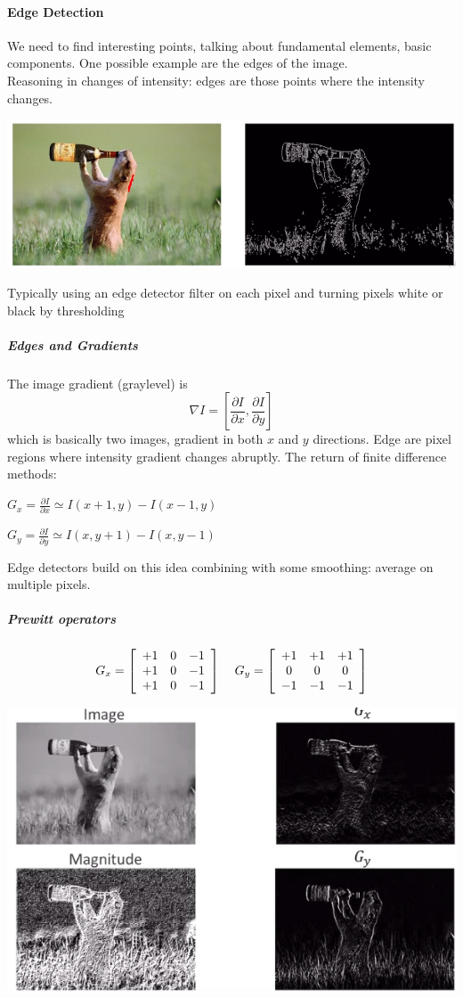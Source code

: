 \documentclass[10pt]{report}
\begin{document}
\paragraph{Edge Detection} We need to find interesting points, talking about fundamental elements, basic components. One possible example are the edges of the image.\\
Reasoning in changes of intensity: edges are those points where the intensity changes.\begin{center}
	\includegraphics[scale=0.5]{4.png}
\end{center}
Typically using an edge detector filter on each pixel and turning pixels white or black by thresholding
\subparagraph{Edges and Gradients} The image gradient (graylevel) is $$\nabla I = \left[\frac{\partial I}{\partial x},\frac{\partial I}{\partial y}\right]$$ which is basically two images, gradient in both $x$ and $y$ directions. Edge are pixel regions where intensity gradient changes abruptly. The return of finite difference methods:
\begin{list}{}{}
	\item $G_x = \frac{\partial I}{\partial x} \simeq I(x+1,y)-I(x-1,y)$
	\item $G_y = \frac{\partial I}{\partial y} \simeq I(x,y+1)-I(x,y-1)$
\end{list}
Edge detectors build on this idea combining with some smoothing: average on multiple pixels.
\subparagraph{Prewitt operators}
$$G_x = \left[\begin{array}{c c c }
+1&0&-1\\
+1&0&-1\\
+1&0&-1
\end{array}\right]\:\:\:\:\:G_y = \left[\begin{array}{c c c }
+1&+1&+1\\
0&0&0\\
-1&-1&-1
\end{array}\right]$$
\begin{center}
	\includegraphics[scale=0.5]{5.png}
\end{center}
\end{document}
